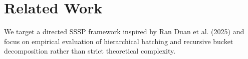 \section{Related Work}
We target a directed SSSP framework inspired by Ran Duan et al. (2025) and focus on empirical evaluation of hierarchical batching
and recursive bucket decomposition rather than strict theoretical complexity.
